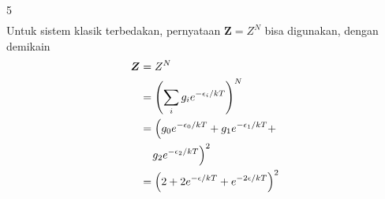\documentclass[a4paper  , 6 pt]{article}
\begin{document}
\begin{tiny}
\begin{multicols} {5}
\begin{align}
\end{align}
Untuk sistem klasik terbedakan, pernyataan $\boldsymbol{ Z} = Z^N $ bisa digunakan, dengan demikain 
\begin{align}
\boldsymbol{Z}& = Z^N \nonumber \\
& = \left(\sum_i g_i e^{-\epsilon_i /kT} \right)^N \nonumber \\
& = \left( g_0 e^{-\epsilon_0 /kT }+ g_1 e^{-\epsilon_1 /kT} + \right.\nonumber 
\\
& \hspace{0.3 cm} \left. g_2 e^{-\epsilon_2 /kT} \right )^2\nonumber \\
& = \left( 2 + 2e^{-\epsilon /kT} + e^{- 2\epsilon /kT} \right)^2  
\end{align}

\end{multicols}
\end{tiny}
\end{document}
